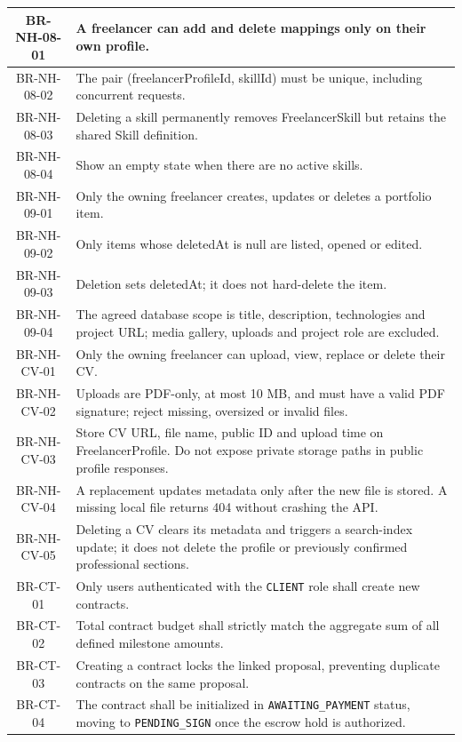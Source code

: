\begin{longtable}{|c|p{12cm}|}
BR-NH-08-01 & A freelancer can add and delete mappings only on their own profile. \\ \hline
BR-NH-08-02 & The pair (freelancerProfileId, skillId) must be unique, including concurrent requests. \\ \hline
BR-NH-08-03 & Deleting a skill permanently removes FreelancerSkill but retains the shared Skill definition. \\ \hline
BR-NH-08-04 & Show an empty state when there are no active skills. \\ \hline
BR-NH-09-01 & Only the owning freelancer creates, updates or deletes a portfolio item. \\ \hline
BR-NH-09-02 & Only items whose deletedAt is null are listed, opened or edited. \\ \hline
BR-NH-09-03 & Deletion sets deletedAt; it does not hard-delete the item. \\ \hline
BR-NH-09-04 & The agreed database scope is title, description, technologies and project URL; media gallery, uploads and project role are excluded. \\ \hline
BR-NH-CV-01 & Only the owning freelancer can upload, view, replace or delete their CV. \\ \hline
BR-NH-CV-02 & Uploads are PDF-only, at most 10 MB, and must have a valid PDF signature; reject missing, oversized or invalid files. \\ \hline
BR-NH-CV-03 & Store CV URL, file name, public ID and upload time on FreelancerProfile. Do not expose private storage paths in public profile responses. \\ \hline
BR-NH-CV-04 & A replacement updates metadata only after the new file is stored. A missing local file returns 404 without crashing the API. \\ \hline
BR-NH-CV-05 & Deleting a CV clears its metadata and triggers a search-index update; it does not delete the profile or previously confirmed professional sections. \\ \hline
    BR-CT-01 & Only users authenticated with the \texttt{CLIENT} role shall create new contracts. \\ \hline
    BR-CT-02 & Total contract budget shall strictly match the aggregate sum of all defined milestone amounts. \\ \hline
    BR-CT-03 & Creating a contract locks the linked proposal, preventing duplicate contracts on the same proposal. \\ \hline
    BR-CT-04 & The contract shall be initialized in \texttt{AWAITING\_PAYMENT} status, moving to \texttt{PENDING\_SIGN} once the escrow hold is authorized. \\ \hline

\end{longtable}
